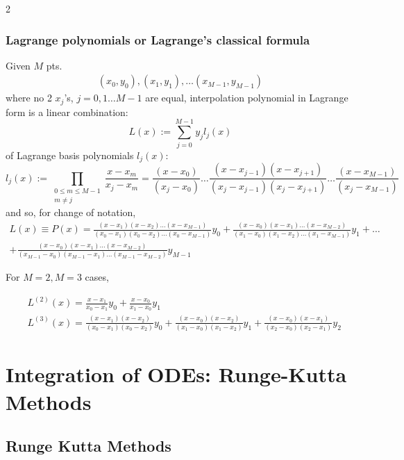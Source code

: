 \documentclass[10pt]{amsart}
\begin{document}
\begin{multicols*}{2}
\subsubsection{Lagrange polynomials or Lagrange's classical formula}

Given $M$ pts.
\[
\begin{gathered}
	(x_0, y_0), (x_1, y_1), \dots (x_{M - 1}, y_{M- 1})
\end{gathered}
\]
where no 2 $x_j$'s, $j= 0, 1 \dots M-1$ are equal, interpolation polynomial in Lagrange form is a linear combination:
\begin{equation}
	L(x) := \sum_{j=0}^{M- 1} y_j l_j(x)
\end{equation}
of Lagrange basis polynomials $l_j(x)$:
\begin{equation}
	l_j(x) := \prod_{ \substack{ 0 \leq m \leq M - 1 \\ m \neq j } } \frac{ x - x_m}{ x_j - x_m } = \frac{ (x- x_0) }{ (x_j - x_0) } \dots \frac{ (x- x_{j-1}) ( x - x_{j+1} ) }{ (x_j - x_{j-1} ) ( x_j - x_{j+1} ) } \dots \frac{ (x- x_{M-1}) }{ (x_j - x_{M- 1})}
\end{equation}
and so, for change of notation,
\[
\begin{gathered}
	L(x) \equiv P(x) = \frac{ (x-x_1) (x-x_2) \dots (x-x_{M-1} ) }{ (x_0 - x_1) (x_0 - x_2) \dots (x_0 - x_{M-1})} y_0 + \frac{ (x-x_0) (x-x_1) \dots (x-x_{M-2} ) }{ (x_1 - x_0) (x_1 - x_2) \dots (x_1 - x_{M-1})} y_1 + \dots \\
	+ \frac{ (x-x_0) (x-x_1) \dots (x-x_{M-2} ) }{ (x_{M-1} - x_0) (x_{M-1} - x_1) \dots (x_{M-1} - x_{M-2})} y_{M - 1}
\end{gathered}
\]

For $M=2, M=3$ cases,

\[
\begin{aligned}
	& L^{(2)}(x) = \frac{ x - x_1}{x_0 - x_1} y_0 + \frac{ x- x_0 }{ x_1 - x_0} y_1 \\
	& L^{(3)}(x) = \frac{ (x - x_1)(x - x_2) }{ (x_0 - x_1) (x_0 - x_2) } y_0 + \frac{ (x - x_0)(x - x_2) }{ (x_1 - x_0) (x_1 - x_2) } y_1 + \frac{ (x- x_0)( x- x_1) }{ (x_2 - x_0)(x_2 - x_1)} y_2
\end{aligned}
\]


\section{Integration of ODEs: Runge-Kutta Methods}

\subsection{Runge Kutta Methods}


\end{multicols*}
\end{document}
